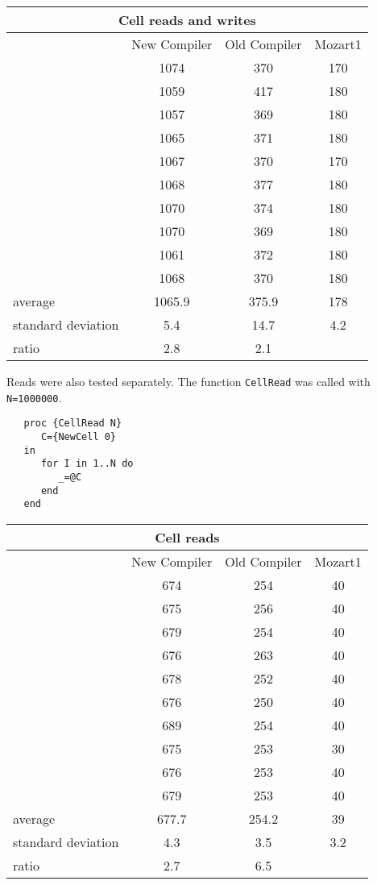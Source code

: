 \documentclass[a4paper]{memoir}
\begin{document}
\begin{appendices}
\begin{center}
\begin{tabular} {| l c c c|}
\hline
\multicolumn{4}{|c|}{\textbf{Cell reads and writes}} \\ \hline
  & New Compiler& Old Compiler & Mozart1 \\
  &         1074&  370& 170\\ 
  &         1059&  417& 180\\
  &         1057&  369& 180\\
  &         1065&  371& 180\\
  &         1067&  370& 170\\
  &         1068&  377& 180\\
  &         1070&  374& 180\\
  &         1070&  369& 180\\
  &         1061&  372& 180\\
  &         1068&  370& 180\\ \hline
average& 1065.9&  375.9& 178\\
standard deviation& 5.4& 14.7&  4.2\\
ratio& 2.8& 2.1 & \\
\hline
\end{tabular}
\end{center}



Reads were also tested separately. The function \lstinline!CellRead! was called
with \lstinline!N=1000000!.

\begin{lstlisting}
   proc {CellRead N}
      C={NewCell 0}
   in
      for I in 1..N do
         _=@C
      end
   end
\end{lstlisting}

\begin{center}
\begin{tabular} {| l c c c|}
\hline
\multicolumn{4}{|c|}{\textbf{Cell reads}} \\ \hline
  & New Compiler& Old Compiler & Mozart1 \\
  &         674& 254& 40\\ 
  &         675& 256& 40\\
  &         679& 254& 40\\
  &         676& 263& 40\\
  &         678& 252& 40\\
  &         676& 250& 40\\
  &         689& 254& 40\\
  &         675& 253& 30\\
  &         676& 253& 40\\
  &         679& 253& 40\\ \hline
average& 677.7& 254.2 & 39\\
standard deviation&4.3& 3.5 & 3.2\\
ratio&  2.7& 6.5& \\
\hline
\end{tabular}
\end{center}




\end{appendices}
\end{document}
